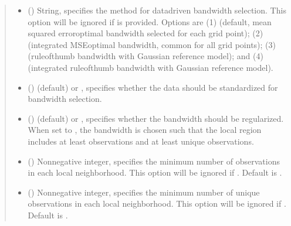 \documentclass[letterpaper,10pt,english]{sphinxmanual}
\begin{document}
\begin{fulllineitems}
\begin{quote}
\begin{description}
\begin{itemize}
\item {} 
\sphinxAtStartPar
{} () \textendash{} String, specifies the method for data\sphinxhyphen{}driven bandwidth selection. This option will be ignored if  is provided. Options are (1)  (default, mean squared error\sphinxhyphen{}optimal bandwidth selected for each grid point); (2)  (integrated MSE\sphinxhyphen{}optimal bandwidth, common for all grid points); (3)  (rule\sphinxhyphen{}of\sphinxhyphen{}thumb bandwidth with Gaussian reference model); and (4)  (integrated rule\sphinxhyphen{}of\sphinxhyphen{}thumb bandwidth with Gaussian reference model).

\item {} 
\sphinxAtStartPar
{} () \textendash{}  (default) or , specifies whether the data should be standardized for bandwidth selection.

\item {} 
\sphinxAtStartPar
{} () \textendash{}  (default) or , specifies whether the bandwidth should be regularized. When set to , the bandwidth is chosen such that the local region includes at least  observations and at least  unique observations.

\item {} 
\sphinxAtStartPar
{} () \textendash{} Nonnegative integer, specifies the minimum number of observations in each local neighborhood. This option will be ignored if . Default is .

\item {} 
\sphinxAtStartPar
{} () \textendash{} Nonnegative integer, specifies the minimum number of unique observations in each local neighborhood. This option will be ignored if . Default is .


\end{itemize}
\end{description}
\end{quote}
\end{fulllineitems}
\end{document}
